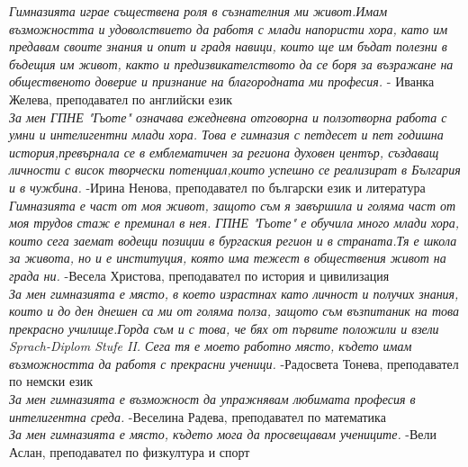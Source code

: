 \begin{multicols}{2}

\textit{Гимназията играе съществена роля в съзнателния ми живот.Имам възможността и удоволствието да работя с млади напористи хора, като им предавам своите знания и опит и градя навици, които ще им бъдат полезни в бъдещия им живот, както и предизвикателството  да се боря за възражане на общественото доверие и признание на благородната ми професия.}
- Иванка Желева, преподавател по английски език \\

\textit{За мен ГПНЕ "Гьоте" означава ежедневна отговорна и ползотворна работа с умни и интелигентни млади хора. Това е гимназия с петдесет и пет годишна история,превърнала се в емблематичен за региона духовен център, създаващ личности с висок творчески потенциал,които успешно се реализират в България и в чужбина.}
-Ирина Ненова, преподавател по български език и литература \\

\textit{Гимназията е част от моя живот, защото съм я завършила и голяма част от моя трудов стаж е преминал в нея. ГПНЕ "Гьоте" е обучила много млади хора, които сега заемат водещи позиции в бургаския регион и в страната.Тя е школа за живота, но и е институция, която има тежест  в обществения живот на града ни.}
-Весела  Христова, преподавател  по история и цивилизация \\

\textit{За мен гимназията е място, в което израстнах като личност и получих знания, които и до ден днешен са ми от голяма полза, защото съм възпитаник на това прекрасно училище.Горда съм и с това, че бях от първите положили и взели Sprach-Diplom Stufe II.
Сега тя е моето работно място, където имам възможността да работя с прекрасни ученици.}
-Радосвета Тонева, преподавател по немски език \\

\textit{За мен гимназията е възможност да упражнявам любимата професия в интелигентна среда.}
-Веселина Радева, преподавател по математика \\

\textit{За мен гимназията е място, където мога да просвещавам учениците.}
-Вели Аслан, преподавател по физкултура и спорт
\closearticle
\end{multicols}

